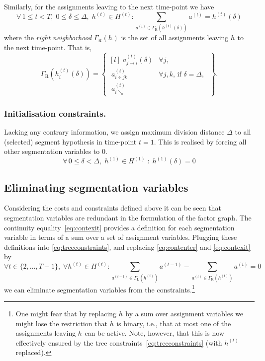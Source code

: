 \documentclass[a4paper]{article}
\newcommand{\set}[1]{\ensuremath{\{#1\}}}
\newcommand{\hypset}[1]{\ensuremath{H^{(#1)}}\xspace}
\newcommand{\vhset}[1]{\hypset{#1}}
\newcommand{\Ht}[1][t]{\vhset{#1}}
\newcommand{\vh}[1][]{\ensuremath{h_{#1}}\xspace}
\newcommand{\vht}[1][t]{\ensuremath{h^{(#1)}}\xspace}
\newcommand{\vhtd}[2][t]{\ensuremath{h^{(#1)}\left({#2}\right)}\xspace}
\newcommand{\vhtid}[3][t]{\ensuremath{h^{(#1)}_{#2}\left({#3}\right)}\xspace}
\newcommand{\vat}[1][t]{\ensuremath{a^{(#1)}}\xspace}
\newcommand{\vamd}[4]{\ensuremath{a^{(#1)}_{#2\mapsto#3}\left(#4\right)}\xspace}
\newcommand{\vad}[3]{\ensuremath{a^{(#1)}_{#2\div#3}}\xspace}
\newcommand{\vae}[2]{\ensuremath{a^{(#1)}_{#2\searrow}}\xspace}
\newcommand{\Gr}[1]{\ensuremath{\Gamma_{\text{R}}\left(#1\right)}\xspace}
\newcommand{\Gl}[1]{\ensuremath{\Gamma_{\text{L}}\left(#1\right)}\xspace}
\newcommand{\ie}{i.e.{}}
\begin{document}
\noindent
Similarly, for the assignments leaving to the next time-point we have
\begin{equation}\label{eq:contexit}
  \forall\, 1 \le t < T,\;
  0 \le \delta \le \Delta,\;
  \vht \in \Ht:
    \sum_{\vat \in \Gr{\vhtd{\delta}}} \vat
  = \vhtd{\delta}
\end{equation}
where the \emph{right neighborhood} \Gr{\vh} is the set of all assignments leaving \vh to the next time-point.
That is,
\begin{equation}
	\Gr{\vhtid{i}{\delta}}
	= \begin{Bmatrix*}[l]
			\; \vamd{t}{j}{i}{\delta}   & \forall j, \\[4mm]
			\; \vad{t}{i}{jk}           & \forall j, k \text{, if } \delta = \Delta,\; \\[4mm]
			\; \vae{t}{i} & 
		\end{Bmatrix*}.
\end{equation}
%
%
\subsubsection{Initialisation constraints.}
%
%
Lacking any contrary information, we assign maximum division distance $\Delta$ to all (selected) segment hypothesis in time-point $t = 1$. This is realised by forcing all other segmentation variables to $0$.
\begin{equation}
	\forall\, 0 \le \delta < \Delta,\; \vht[1] \in \Ht[1]\;:\; \vhtd[1]{\delta} = 0
\end{equation}

%
%
\subsection{Eliminating segmentation variables}
\label{sec:varelim}
%
Considering the costs and constraints defined above it can be seen that segmentation variables are redundant in the formulation of the factor graph.
The continuity equality~\eqref{eq:contexit} provides a definition for each segmentation variable in terms of a sum over a set of assignment variables.
Plugging these definitions into \eqref{eq:treeconstraints}, and replacing \eqref{eq:contenter} and \eqref{eq:contexit} by
\begin{equation}
  \forall t \in \set{2, \dots, T-1},\;
  \forall \vht \in \Ht:
    \!\!\!\!\!
    \sum_{\vat[t-1] \in \Gl{\vht}}
    \!\!\!\!\!
      \vat[t-1]
  -
    \!\!\!\!\!
    \sum_{\vat \in \Gr{\vht}}
    \!\!\!\!\!
      \vat = 0
\end{equation}
we can eliminate segmentation variables from the constraints.\footnote{%
One might fear that by replacing \vh by a sum over assignment variables we might lose the restriction that \vh is binary, \ie, that at most one of the
  assignments leaving \vh can be active.
Note, however, that this is now effectively ensured by the tree constraints~\eqref{eq:treeconstraints} (with \vht replaced).}
\end{document}

